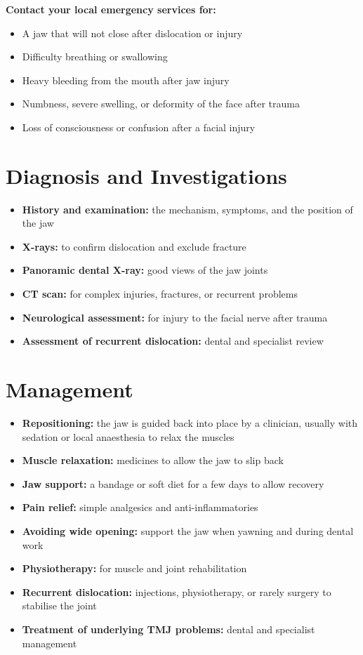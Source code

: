 \textbf{Contact your local emergency services for:}
\begin{itemize}
    \item A jaw that will not close after dislocation or injury
    \item Difficulty breathing or swallowing
    \item Heavy bleeding from the mouth after jaw injury
    \item Numbness, severe swelling, or deformity of the face after trauma
    \item Loss of consciousness or confusion after a facial injury
\end{itemize}

\section*{Diagnosis and Investigations}
\begin{itemize}
    \item \textbf{History and examination:} the mechanism, symptoms, and the position of the jaw
    \item \textbf{X-rays:} to confirm dislocation and exclude fracture
    \item \textbf{Panoramic dental X-ray:} good views of the jaw joints
    \item \textbf{CT scan:} for complex injuries, fractures, or recurrent problems
    \item \textbf{Neurological assessment:} for injury to the facial nerve after trauma
    \item \textbf{Assessment of recurrent dislocation:} dental and specialist review
\end{itemize}

\section*{Management}
\begin{itemize}
    \item \textbf{Repositioning:} the jaw is guided back into place by a clinician, usually with sedation or local anaesthesia to relax the muscles
    \item \textbf{Muscle relaxation:} medicines to allow the jaw to slip back
    \item \textbf{Jaw support:} a bandage or soft diet for a few days to allow recovery
    \item \textbf{Pain relief:} simple analgesics and anti-inflammatories
    \item \textbf{Avoiding wide opening:} support the jaw when yawning and during dental work
    \item \textbf{Physiotherapy:} for muscle and joint rehabilitation
    \item \textbf{Recurrent dislocation:} injections, physiotherapy, or rarely surgery to stabilise the joint
    \item \textbf{Treatment of underlying TMJ problems:} dental and specialist management
\end{itemize}

